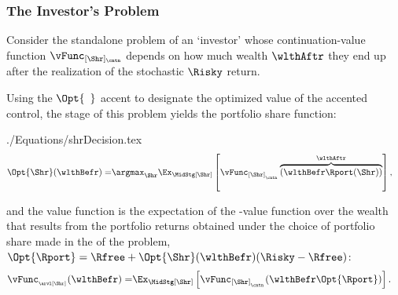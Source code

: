 \documentclass[SolvingMicroDSOPs]{subfiles}
\begin{document}
\hypertarget{subsubsec:investors-problem}{}
\subsubsection{The Investor's Problem}\label{subsubsec:investors-problem}

Consider the standalone problem of an `investor' whose continuation-value function $\vFunc_{[\Shr]_\cntn}$ depends on how much wealth $\wlthAftr$ they end up after the realization of the stochastic $\Risky$ return.

Using the $\Opt{\phantom{\bullet}}$ accent to designate the optimized value of the accented control, the {\Decision} stage of this problem yields the portfolio share function:
\begin{verbatimwrite}{./Equations/shrDecision.tex}
  \begin{equation}\begin{gathered}\begin{aligned}
    \Opt{\Shr}(\wlthBefr)  = & \argmax_{\Shr} \Ex_{\MidStg[\Shr]}\left[\vFunc_{[\Shr]_{_\cntn}}\overbrace{\left({\wlthBefr}\Rport(\Shr)\right)}^{\wlthAftr}\right] \label{eq:shrDecision},
         \end{aligned}\end{gathered}\end{equation}
\end{verbatimwrite}
\unskip
and the {\Arrival} value function is the expectation of the {\Continuation}-value function over the wealth that results from the portfolio returns obtained under the choice of portfolio share made in the {\Decision} {\move} of the problem, $\Opt{\Rport}=\Rfree+\Opt{\Shr}(\wlthBefr)(\Risky-\Rfree)$:
\begin{equation}\begin{gathered}\begin{aligned}
  \vFunc_{_\arvl[\Shr]}(\wlthBefr)  = & \Ex_{\MidStg[\Shr]}\left[ \vFunc_{[\Shr]_{_\cntn}}(\wlthBefr \Opt{\Rport} )\right] \label{eq:vMidStgShr}.
    \end{aligned}\end{gathered}\end{equation}
\end{document}
